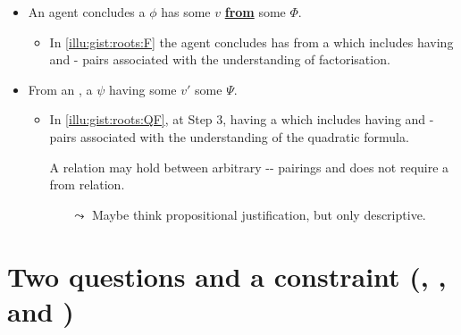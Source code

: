 \documentclass[10pt]{article}
\newcommand{\hand}{\ding{43}}
\begin{document}
\begin{note}
  \begin{itemize}
  \item
    An agent concludes a  \(\phi\) has some  \(v\) \underline{\textbf{from}} some \pool{} \(\Phi\).
    \begin{itemize}
    \item
      In \autoref{illu:gist:roots:F} the agent concludes \propI{\rootsCon{}} has \val{}  from a \pool{} which includes \propM{\rootsConEq{}} having   and - pairs associated with the \agents{} understanding of factorisation.
    \end{itemize}
  \item
    From an \agpe{}, a  \(\psi\) having some  \(v'\) \underline{\textbf{\fof{}}} some \pool{} \(\Psi\).
    \begin{itemize}
    \item
      In \autoref{illu:gist:roots:QF}, at Step 3, \propI{\rootsCon{}} having \val{}  \fof{} a \pool{} which includes \propM{\rootsConEq{}} having   and - pairs associated with the \agents{} understanding of the quadratic formula.
    \end{itemize}
    \begin{itemize}
    \item[\hand]
      A \fof{} relation may hold between arbitrary -- pairings and does not require a from relation.
      \begin{itemize}
      \item[\(\leadsto\)]
        Maybe think propositional justification, but only descriptive.
      \end{itemize}
    \end{itemize}
  \end{itemize}

\end{note}

\section{Two questions and a constraint \hfill (\qWhy{}, \qHow{}, and \issueInclusion{})}
\label{sec:target}

\vfill
\end{document}
